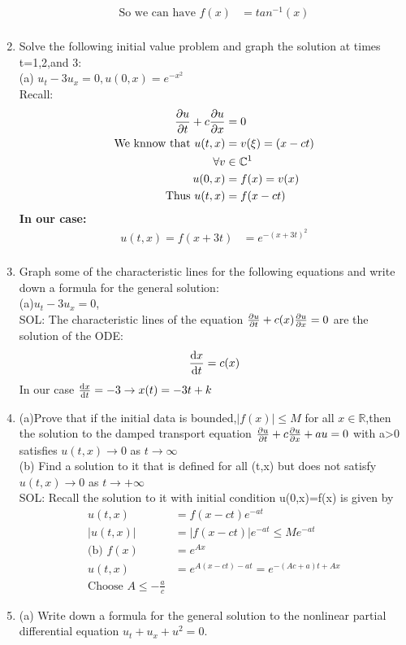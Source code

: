 \begin{enumerate}[label=\circled{\arabic*}]
\begin{align*}{}{}
\text{So we can have } f(x)&=tan^{-1}(x)\\
\end{align*}     
\item Solve the following initial value problem and graph the solution at times t=1,2,and 3:\\
(a) $u_t-3u_x=0,u(0,x)=e^{-x^2}$
\\Recall:\begin{align*}{}{}
\pdv{u}{t}+c\pdv{u}{x}&=0\\
\text{We knnow that } u(t,x)&=v(\xi)=(x-ct)\\
\forall v&\in \mathbb{C}^1\\
u(0,x)&=f(x)=v(x)\\
\text{Thus }u(t,x)&=f(x-ct)\\
\end{align*}
\textbf{In our case:}
\begin{align*}{}{}
u(t,x)=f(x+3t)&=e^{-(x+3t)^2}\\
\end{align*}
\item Graph some of the characteristic lines for the following equations and write down a formula for the general solution:
\\(a)$u_t-3u_x=0$,
\\SOL: The characteristic lines of the equation $\pdv{u}{t}+c(x) \pdv{u}{x}=0$ are the solution of the ODE:$$
    \dv{x}{t}=c(x)
$$ 
In our case $ \dv{x}{t}=-3 \rightarrow x(t)=-3t+k $ 
\item (a)Prove that if the initial data is bounded,$|f(x)| \leq M $ for all $ x\in\mathbb{R} $,then the solution to the damped transport equation $\pdv{u}{t}+c\pdv{u}{x}+au=0 $ with a>0 satisfies $ u(t,x)\rightarrow 0 $ as $ t\rightarrow\infty $  
\\(b) Find a solution to it that is defined for all (t,x) but does not satisfy $ u(t,x)\rightarrow0 $ as $ t\rightarrow +\infty $  
\\SOL: Recall the solution to it with initial condition u(0,x)=f(x) is given by \begin{align*}{}{}
u(t,x)&=f(x-ct)e^{-at}\\
|u(t,x)|&=|f(x-ct)|e^{-at}\leq Me^{-at}\\
\text{(b) }f(x)&=e^{Ax}\\
u(t,x)&=e^{A(x-ct)-at}=e^{-(Ac+a)t+Ax}\\
\text{Choose }A\leq -\frac{a}{c}
\end{align*}
\item (a) Write down a formula for the general solution to the nonlinear partial differential equation $u_{t}+u_{x}+u^{2}=0$. \\

\end{enumerate}
